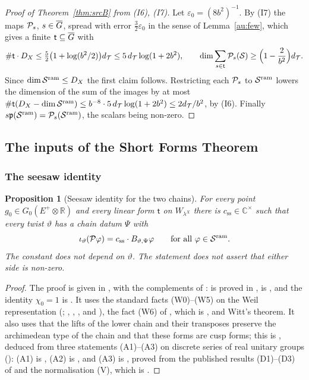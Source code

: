 \documentclass[10pt]{amsart}
\newtheorem{proposition}[theorem]{Proposition}
\theoremstyle{definition}
\theoremstyle{remark}
\newcommand{\C}{\mathbb C}
\newcommand{\R}{\mathbb R}
\begin{document}
\begin{proof}[Proof of Theorem~\ref{thm:srcB} from (I6), (I7)]
Let $\varepsilon_0=(8b^2)^{-1}$. By (I7) the maps $\mathcal P_s$, $s\in\overline G$, spread with error
$\tfrac32\varepsilon_0$ in the sense of Lemma~\ref{au:few}, which gives a finite
$\mathsf t\subseteq\overline G$ with
\[
\#\mathsf t\cdot D_X\le\tfrac52\bigl(1+\log(b^2/2)\bigr)d_{\mathcal T}\le5\,d_{\mathcal T}\log(1+2b^2),\qquad
\dim\sum_{s\in\mathsf t}\mathcal P_s(\mathcal S)\ge\Bigl(1-\frac2{b^2}\Bigr)d_{\mathcal T} .
\]
Since $\dim\mathcal S^{\mathrm{ram}}\le D_X$ the first claim follows. Restricting each $\mathcal P_s$ to $\mathcal S^{\mathrm{ram}}$ lowers
the dimension of the sum of the images by at most $\#\mathsf t(D_X-\dim\mathcal S^{\mathrm{ram}})\le
b^{-8}\cdot5\,d_{\mathcal T}\log(1+2b^2)\le2d_{\mathcal T}/b^2$, by (I6). Finally
$s\mathfrak p(\mathcal S^{\mathrm{ram}})=\mathcal P_s(\mathcal S^{\mathrm{ram}})$, the scalars being non-zero.
\end{proof}

\subsection{The inputs of the Short Forms Theorem}\label{ss:au-inputsA}

\subsubsection*{The seesaw identity}

\begin{proposition}[Seesaw identity for the two chains]\label{au:seesaw}
For every point $g_0\in G_0(E^+\otimes\R)$ and every linear form $\mathsf t$ on $W_{\lambda^X}$
there is $c_{\mathrm{ss}}\in\C^\times$ such that every twist $\vartheta$ has a chain datum $\Psi$
with
\[
\iota_\vartheta(\mathcal P\varphi)=c_{\mathrm{ss}}\cdot B_{\vartheta,\Psi}\varphi\qquad\text{for all }
\varphi\in\mathcal S^{\mathrm{ram}} .
\]
The constant does not depend on $\vartheta$. The statement does not assert that either side is
non-zero.
\end{proposition}
\begin{proof}
The proof is given in {\cite[\S5.1.7]{P49}}, with the complements of {\cite[\S5.2]{P49}}:
{\cite[Proposition~5.9]{P49}} is proved in {\cite[\S5.2.4]{P49}}, {\cite[Lemma~5.3]{P49}} is
{\cite[Proposition~5.16]{P49}}, and the identity $\chi_0=1$ is {\cite[Lemma~5.17]{P49}}. It uses the standard
facts (W0)--(W5) on the Weil representation ({\cite[Lemma~5.2]{P49}}; \cite{WeilActa},
\cite{KudlaSplitting}, \cite{HKS}, and {\cite[\S2]{P49}}), the fact (W6) of {\cite[\S5.2.1]{P49}}, which is
{\cite[Proposition~7.17]{P49}}, and Witt's theorem. It also uses that the lifts of the lower chain
and their transposes preserve the archimedean type of the chain and that these forms are cusp
forms; this is {\cite[Proposition~8.4]{P49}}, deduced from three statements (A1)--(A3) on
discrete series of real unitary groups ({\cite[\S8.1]{P49}}): (A1) is {\cite[Theorem~3.2]{P49}}, (A2) is
{\cite[Corollary~3.3]{P49}}, and (A3) is {\cite[Theorem~3.15]{P49}}, proved from the published results
(D1)--(D3) of {\cite[\S3.1.3]{P49}} and the normalisation (V), which is {\cite[Theorem~3.29]{P49}}.
\end{proof}
\end{document}
